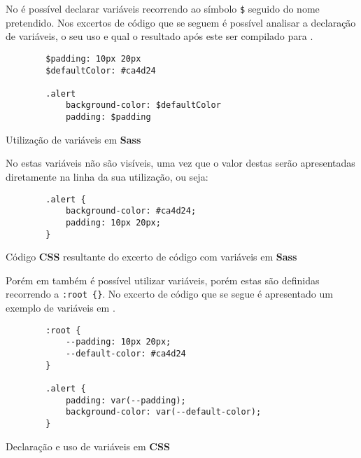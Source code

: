 
No \textbf{} é possível declarar variáveis recorrendo ao símbolo \verb|$| seguido do nome pretendido. Nos excertos de código que se seguem é possível analisar a declaração de variáveis, o seu uso e qual o resultado após este ser compilado para \textbf{}.

\begin{longlisting}
	\begin{verbatim}
		$padding: 10px 20px
		$defaultColor: #ca4d24

		.alert
			background-color: $defaultColor
			padding: $padding
	\end{verbatim}
	\caption{Utilização de variáveis em \textbf{Sass}}
\end{longlisting}

No \textbf{} estas variáveis não são visíveis, uma vez que o valor destas serão apresentadas diretamente na linha da sua utilização, ou seja:

\begin{longlisting}
	\begin{verbatim}
		.alert {
			background-color: #ca4d24;
			padding: 10px 20px;
		}
	\end{verbatim}
	\caption{Código \textbf{CSS} resultante do excerto de código com variáveis em \textbf{Sass}}
\end{longlisting}

Porém em \textbf{} também é possível utilizar variáveis, porém estas são definidas recorrendo a \verb|:root {}|. No excerto de código que se segue é apresentado um exemplo de variáveis em \textbf{}.

\begin{longlisting}
	\begin{verbatim}
		:root {
			--padding: 10px 20px;
			--default-color: #ca4d24
		}

		.alert {
			padding: var(--padding);
			background-color: var(--default-color);
		}
	\end{verbatim}
	\caption{Declaração e uso de variáveis em \textbf{CSS}}
\end{longlisting}